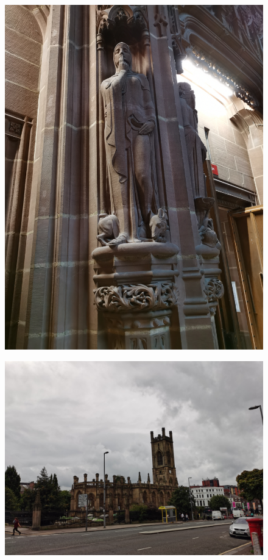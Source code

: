 \documentclass[11pt]{article}
\begin{document}
\begin{figure}[H]
    \centering
    \includegraphics[width=\textwidth]{1P.jpg}
\end{figure}
  
\begin{figure}[H]
    \centering
    \includegraphics[width=\textwidth]{1Q.jpg}
\end{figure}
\end{document}

